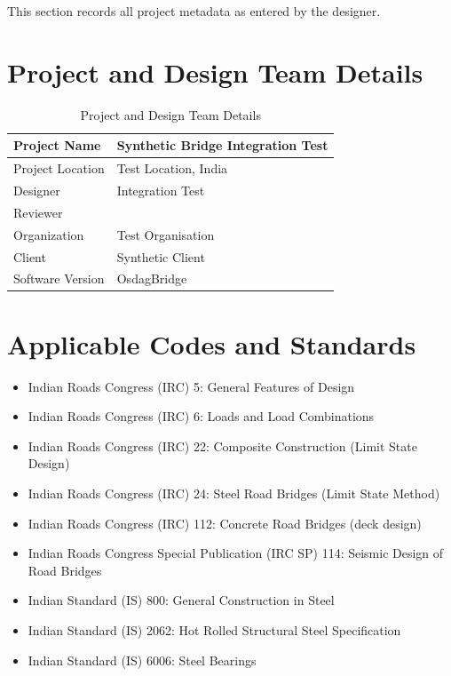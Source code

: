 \documentclass[12pt,a4paper]{report}
\numberwithin{figure}{chapter}
\begin{document}
This section records all project metadata as entered by the designer.

\section{Project and Design Team Details}
\label{sec:project-details}

\begin{table}[H]
\centering
{}
\caption{Project and Design Team Details}
\begin{tabular}{|L{5.73cm}|L{8.85cm}|}
\hline
Project Name & Synthetic Bridge Integration Test \\
\hline
Project Location & Test Location, India \\
\hline
Designer & Integration Test \\
\hline
Reviewer &  \\
\hline
Organization & Test Organisation \\
\hline
Client & Synthetic Client \\
\hline
Software Version & OsdagBridge \\
\hline
\end{tabular}
\end{table}


\section{Applicable Codes and Standards}
\label{sec:codes}

\begin{itemize}
\item Indian Roads Congress (IRC) 5: General Features of Design
\item Indian Roads Congress (IRC) 6: Loads and Load Combinations
\item Indian Roads Congress (IRC) 22: Composite Construction (Limit State Design)
\item Indian Roads Congress (IRC) 24: Steel Road Bridges (Limit State Method)
\item Indian Roads Congress (IRC) 112: Concrete Road Bridges (deck design)
\item Indian Roads Congress Special Publication (IRC SP) 114: Seismic Design of Road Bridges
\item Indian Standard (IS) 800: General Construction in Steel
\item Indian Standard (IS) 2062: Hot Rolled Structural Steel Specification
\item Indian Standard (IS) 6006: Steel Bearings
\end{itemize}
\end{document}

